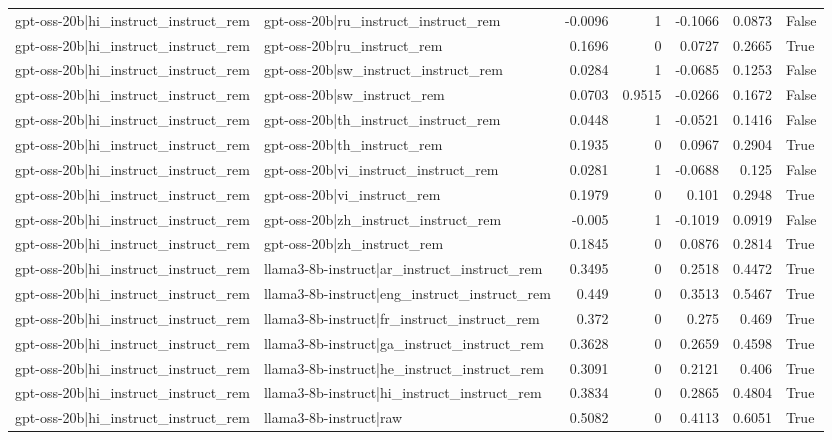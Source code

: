 \begin{table}
\begin{tabular}{l l r r r r l}
gpt-oss-20b|hi_instruct_instruct_rem & gpt-oss-20b|ru_instruct_instruct_rem & -0.0096 & 1 & -0.1066 & 0.0873 & False \\
gpt-oss-20b|hi_instruct_instruct_rem & gpt-oss-20b|ru_instruct_rem & 0.1696 & 0 & 0.0727 & 0.2665 & True \\
gpt-oss-20b|hi_instruct_instruct_rem & gpt-oss-20b|sw_instruct_instruct_rem & 0.0284 & 1 & -0.0685 & 0.1253 & False \\
gpt-oss-20b|hi_instruct_instruct_rem & gpt-oss-20b|sw_instruct_rem & 0.0703 & 0.9515 & -0.0266 & 0.1672 & False \\
gpt-oss-20b|hi_instruct_instruct_rem & gpt-oss-20b|th_instruct_instruct_rem & 0.0448 & 1 & -0.0521 & 0.1416 & False \\
gpt-oss-20b|hi_instruct_instruct_rem & gpt-oss-20b|th_instruct_rem & 0.1935 & 0 & 0.0967 & 0.2904 & True \\
gpt-oss-20b|hi_instruct_instruct_rem & gpt-oss-20b|vi_instruct_instruct_rem & 0.0281 & 1 & -0.0688 & 0.125 & False \\
gpt-oss-20b|hi_instruct_instruct_rem & gpt-oss-20b|vi_instruct_rem & 0.1979 & 0 & 0.101 & 0.2948 & True \\
gpt-oss-20b|hi_instruct_instruct_rem & gpt-oss-20b|zh_instruct_instruct_rem & -0.005 & 1 & -0.1019 & 0.0919 & False \\
gpt-oss-20b|hi_instruct_instruct_rem & gpt-oss-20b|zh_instruct_rem & 0.1845 & 0 & 0.0876 & 0.2814 & True \\
gpt-oss-20b|hi_instruct_instruct_rem & llama3-8b-instruct|ar_instruct_instruct_rem & 0.3495 & 0 & 0.2518 & 0.4472 & True \\
gpt-oss-20b|hi_instruct_instruct_rem & llama3-8b-instruct|eng_instruct_instruct_rem & 0.449 & 0 & 0.3513 & 0.5467 & True \\
gpt-oss-20b|hi_instruct_instruct_rem & llama3-8b-instruct|fr_instruct_instruct_rem & 0.372 & 0 & 0.275 & 0.469 & True \\
gpt-oss-20b|hi_instruct_instruct_rem & llama3-8b-instruct|ga_instruct_instruct_rem & 0.3628 & 0 & 0.2659 & 0.4598 & True \\
gpt-oss-20b|hi_instruct_instruct_rem & llama3-8b-instruct|he_instruct_instruct_rem & 0.3091 & 0 & 0.2121 & 0.406 & True \\
gpt-oss-20b|hi_instruct_instruct_rem & llama3-8b-instruct|hi_instruct_instruct_rem & 0.3834 & 0 & 0.2865 & 0.4804 & True \\
gpt-oss-20b|hi_instruct_instruct_rem & llama3-8b-instruct|raw & 0.5082 & 0 & 0.4113 & 0.6051 & True \\

\end{tabular}
\end{table}
